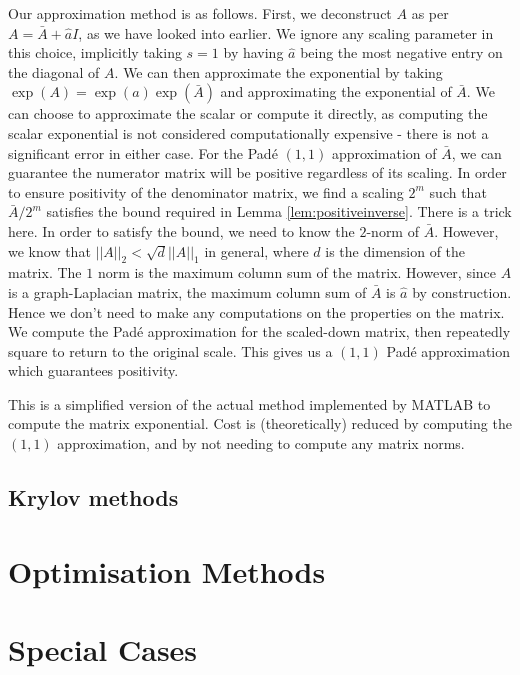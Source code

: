 Our approximation method is as follows.
First, we deconstruct $A$ as per $A = \bar{A} + \hat{a}I$, as we have looked into earlier.
We ignore any scaling parameter in this choice, implicitly taking $s=1$ by having $\hat{a}$ being the most negative entry on the diagonal of $A$.
We can then approximate the exponential by taking $\exp(A) = \exp(a)\exp(\bar{A})$ and approximating the exponential of $\bar{A}$.
We can choose to approximate the scalar or compute it directly, as computing the scalar exponential is not considered computationally expensive - there is not a significant error in either case.
For the Pad\'e $(1,1)$ approximation of $\bar{A}$, we can guarantee the numerator matrix will be positive regardless of its scaling.
In order to ensure positivity of the denominator matrix, we find a scaling $2^m$ such that $\bar{A}/2^m$ satisfies the bound required in Lemma \ref{lem:positiveinverse}.
There is a trick here. In order to satisfy the bound, we need to know the $2$-norm of $\bar{A}$.
However, we know that $||A||_2 < \sqrt{d}||A||_1$ in general, where $d$ is the dimension of the matrix.
The $1$ norm is the maximum column sum of the matrix. However, since $A$ is a graph-Laplacian matrix, the maximum column sum of $\bar{A}$ is $\hat{a}$ by construction.
Hence we don't need to make any computations on the properties on the matrix.
We compute the Pad\'e approximation for the scaled-down matrix, then repeatedly square to return to the original scale.
This gives us a $(1,1)$ Pad\'e approximation which guarantees positivity.

This is a simplified version of the actual method implemented by MATLAB to compute the matrix exponential.
Cost is (theoretically) reduced by computing the $(1,1)$ approximation,
and by not needing to compute any matrix norms.



\subsection{Krylov methods}

\section{Optimisation Methods}




\section{Special Cases}




